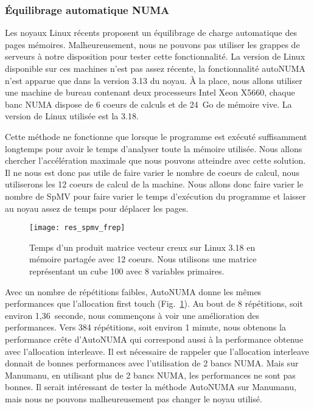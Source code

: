\subsubsection{\'Equilibrage automatique NUMA}
Les noyaux Linux récents proposent un équilibrage de charge automatique des pages mémoires.
%
Malheureusement, nous ne pouvons pas utiliser les grappes de serveurs à notre disposition pour tester cette fonctionnalité.
%
La version de Linux disponible sur ces machines n'est pas assez récente, la fonctionnalité autoNUMA n'est apparue que dans la version 3.13 du noyau.
%
\`A la place, nous allons utiliser une machine de bureau contenant deux processeurs Intel Xeon X5660, chaque banc NUMA dispose de 6 coeurs de calculs et de 24~Go de mémoire vive.
%
La version de Linux utilisée est la 3.18.

Cette méthode ne fonctionne que lorsque le programme est exécuté suffisamment longtemps pour avoir le temps d'analyser toute la mémoire utilisée.
%
Nous allons chercher l'accélération maximale que nous pouvons atteindre avec cette solution.
%
Il ne nous est donc pas utile de faire varier le nombre de coeurs de calcul, nous utiliserons les 12 coeurs de calcul de la machine.
%
Nous allons donc faire varier le nombre de SpMV pour faire varier le temps d'exécution du programme et laisser au noyau assez de temps pour déplacer les pages.

\begin{figure}
  \centering
  \texttt{[image: res\_spmv\_frep]}
  \caption{Temps d'un produit matrice vecteur creux sur Linux 3.18 en mémoire partagée avec 12 coeurs. Nous utilisons une matrice représentant un cube 100 avec 8 variables primaires.}
  \label{fig:res_spmv_frep}
\end{figure}

Avec un nombre de répétitions faibles, AutoNUMA donne les mêmes performances que l'allocation first touch (Fig.~\ref{fig:res_spmv_frep}).
%
Au bout de 8 répétitions, soit environ 1,36~seconde, nous commençons à voir une amélioration des performances.
%
Vers 384 répétitions, soit environ 1 minute, nous obtenons la performance crête d'AutoNUMA qui correspond aussi à la performance obtenue avec l'allocation interleave.
%
Il est nécessaire de rappeler que l'allocation interleave donnait de bonnes performances avec l'utilisation de 2 bancs NUMA.
%
Mais sur Manumanu, en utilisant plus de 2 bancs NUMA, les performances ne sont pas bonnes.
%
Il serait intéressant de tester la méthode AutoNUMA sur Manumanu, mais nous ne pouvons malheureusement pas changer le noyau utilisé.
